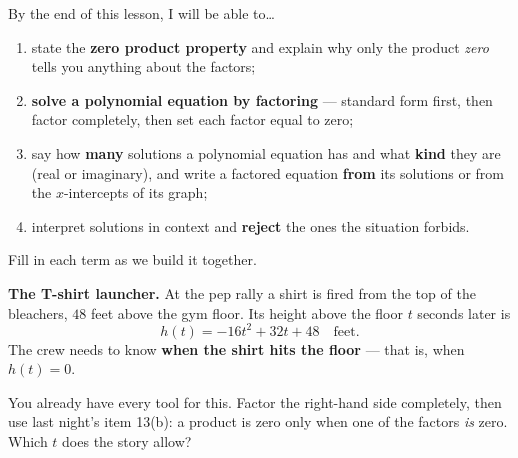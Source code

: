 \documentclass[10pt]{article}
\begin{document}

\vspace{0.15in}

\begin{objectivebox}
\small
By the end of this lesson, I will be able to\dots
\begin{enumerate}[leftmargin=1.5em, itemsep=2pt, topsep=3pt]
  \item state the \textbf{zero product property} and explain why only the product \emph{zero}
        tells you anything about the factors;
  \item \textbf{solve a polynomial equation by factoring} --- standard form first, then factor
        completely, then set each factor equal to zero;
  \item say how \textbf{many} solutions a polynomial equation has and what \textbf{kind} they are
        (real or imaginary), and write a factored equation \textbf{from} its solutions or from the
        $x$-intercepts of its graph;
  \item interpret solutions in context and \textbf{reject} the ones the situation forbids.
\end{enumerate}
\end{objectivebox}

\vspace{0.10in}

\boxguard
\begin{vocabbox}
\small
Fill in each term as we build it together.
\end{vocabbox}

\vspace{0.10in}

\boxguard[12]
\begin{hookbox}
\small
\textbf{The T-shirt launcher.} At the pep rally a shirt is fired from the top of the bleachers,
$48$ feet above the gym floor. Its height above the floor $t$ seconds later is
\[ h(t) = -16t^2+32t+48 \quad \text{feet.} \]
The crew needs to know \textbf{when the shirt hits the floor} --- that is, when $h(t)=0$.

You already have every tool for this. Factor the right-hand side completely, then use last night's
item 13(b): a product is zero only when one of the factors \emph{is} zero. Which $t$ does the story
allow?

\end{hookbox}
\end{document}
